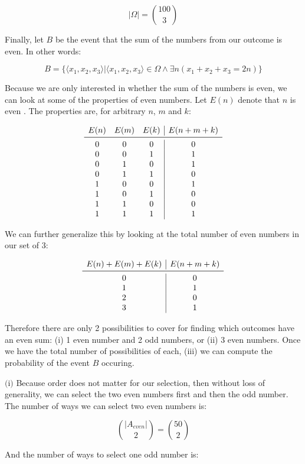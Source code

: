 \documentclass{article}
\newcommand{\subproblem}[1]{$\boxed{\text{(#1)}}$}
\begin{document}
\begin{multicols*}{2}
\[
|\Omega|=\binom{100}{3}
\]

Finally, let $B$ be the event that the sum of the numbers from our
outcome is even. In other words:

\[
B=\{\langle x_1,x_2,x_3\rangle|\langle x_1,x_2,x_3\rangle\in\Omega\wedge \exists n(x_1+x_2+x_3=2n)\}
\]

Because we are only interested in whether the sum of the numbers is
even, we can look at some of the properties of even numbers. Let
$E(n)$ denote that $n$ is even . The properties are, for arbitrary
$n$, $m$ and $k$:

\[
\begin{array}{ccc|c}
E(n) & E(m) & E(k) & E(n+m+k) \\
\midrule
0 & 0 & 0 & 0 \\
0 & 0 & 1 & 1 \\
0 & 1 & 0 & 1 \\
0 & 1 & 1 & 0 \\
1 & 0 & 0 & 1 \\
1 & 0 & 1 & 0 \\
1 & 1 & 0 & 0 \\
1 & 1 & 1 & 1 \\
\end{array}
\]

We can further generalize this by looking at the total number of even
numbers in our set of 3:

\[
\begin{array}{c|c}
E(n)+E(m)+E(k) & E(n+m+k) \\
\midrule
0 & 0 \\
1 & 1 \\
2 & 0 \\
3 & 1 \\
\end{array}
\]

Therefore there are only 2 possibilities to cover for finding which
outcomes have an even sum: (i) 1 even number and 2 odd numbers, or
(ii) 3 even numbers. Once we have the total number of possibilities of
each, (iii) we can compute the probability of the event $B$ occuring.

%
\subproblem{i} Because order does not matter for our selection, then
without loss of generality, we can select the two even numbers first
and then the odd number. The number of ways we can select two even
numbers is:

\[
\binom{|A_{even}|}{2}=\binom{50}{2}
\]

And the number of ways to select one odd number is:


\end{multicols*}
\end{document}
